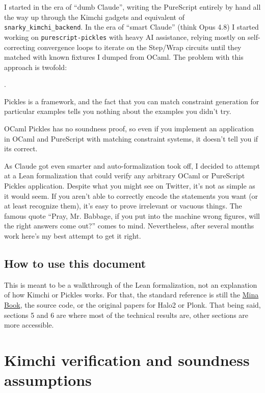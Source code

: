 \documentclass[11pt,a4paper]{article}
\newcommand{\inlinecode}[1]{\mbox{\texttt{#1}}}
\theoremstyle{definition}
\theoremstyle{insetstatement}
\newcounter{boundarypart}
\newenvironment{boundary}{\begin{list}{\arabic{boundarypart}.}{
  \usecounter{boundarypart}
  \setlength{\leftmargin}{1.6em}
  \setlength{\labelwidth}{1.1em}
  \setlength{\labelsep}{0.5em}
  \setlength{\itemsep}{2pt}
  \setlength{\topsep}{3pt}
  \setlength{\parsep}{0pt}}}{\end{list}}
\begin{document}
I started in the era of ``dumb Claude'', writing the PureScript entirely by hand all the way up
through the Kimchi gadgets and equivalent of \inlinecode{snarky\_kimchi\_backend}. In the era of ``smart Claude''
(think Opus 4.8) I started working on \inlinecode{purescript-pickles} with heavy AI assistance, relying mostly on
self-correcting convergence loops to iterate on the Step/Wrap circuits until they matched with known fixtures
I dumped from OCaml. The problem with this approach is twofold:
\begin{boundary}
\item Pickles is a framework, and the fact that you can match constraint generation for particular examples
  tells you nothing about the examples you didn't try.
\item OCaml Pickles has no soundness proof, so even if you implement an application in OCaml and PureScript
  with matching constraint systems, it doesn't tell you if its correct.
\end{boundary}

As Claude got even smarter and auto-formalization took off, I decided to attempt
at a Lean formalization that could verify any arbitrary OCaml or PureScript Pickles application.
Despite what you might see on Twitter, it's not as simple as it would seem. If you
aren't able to correctly encode the statements you want (or at least recognize them), it's easy
to prove irrelevant or vacuous things. The famous quote ``Pray, Mr. Babbage, if you put
into the machine wrong figures, will the right answers come out?'' comes to mind. Nevertheless,
after several months work here's my best attempt to get it right.

\subsection{How to use this document}
\label{sec:how-to-use}

This is meant to be a walkthrough of the Lean formalization, not an explanation of how Kimchi or
Pickles works. For that, the standard reference is still the \href{https://o1-labs.github.io/proof-systems/}{Mina Book}, the source
code, or the original papers for Halo2 or Plonk. That being said, sections 5 and 6 are where
most of the technical results are, other sections are more accessible.

\section{Kimchi verification and soundness assumptions}
\label{sec:kimchi-model}
\end{document}
